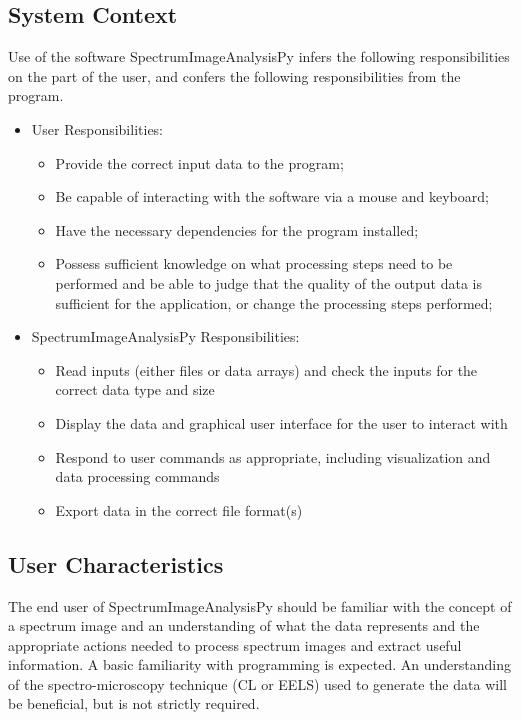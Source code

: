 \documentclass[12pt]{article}
\newcommand{\progname}{SpectrumImageAnalysisPy} %
\begin{document}
\subsection{System Context}

Use of the software \progname{} infers the following responsibilities on the part of the user, and confers the following responsibilities from the program.

\begin{itemize}
	\item User Responsibilities:
	\begin{itemize}
		\item Provide the correct input data to the program;
		\item Be capable of interacting with the software via a mouse and keyboard;
		\item Have the necessary dependencies for the program installed;
		\item Possess sufficient knowledge on what processing steps need to be performed and be able to judge that the quality of the output data is sufficient for the application, or change the processing steps performed;
	\end{itemize}
	\item \progname{} Responsibilities:
	\begin{itemize}
		\item Read inputs (either files or data arrays) and check the inputs for the correct data type and size
		\item Display the data and graphical user interface for the user to interact with
		\item Respond to user commands as appropriate, including visualization and data processing commands
		\item Export data in the correct file format(s)
	\end{itemize}
\end{itemize}

\subsection{User Characteristics} \label{SecUserCharacteristics}

The end user of \progname{} should be familiar with the concept of a spectrum
image and an understanding of what the data represents and the appropriate
actions needed to process spectrum images and extract useful information. A basic familiarity with programming is expected. An
understanding of the spectro-microscopy technique (CL or EELS) used to generate the data will
be beneficial, but is not strictly required. 
\end{document}
